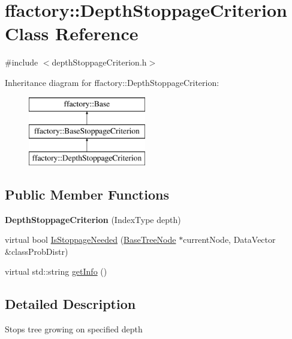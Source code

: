 \hypertarget{classffactory_1_1_depth_stoppage_criterion}{\section{ffactory\-:\-:Depth\-Stoppage\-Criterion Class Reference}
\label{classffactory_1_1_depth_stoppage_criterion}
}


{\ttfamily \#include $<$depth\-Stoppage\-Criterion.\-h$>$}

Inheritance diagram for ffactory\-:\-:Depth\-Stoppage\-Criterion\-:\begin{figure}[H]
\begin{center}
\leavevmode
\includegraphics[height=3.000000cm]{classffactory_1_1_depth_stoppage_criterion}
\end{center}
\end{figure}
\subsection*{Public Member Functions}
\begin{DoxyCompactItemize}
\item 
\hypertarget{classffactory_1_1_depth_stoppage_criterion_ad2287a470cebd743f7c7c4226f50885c}{{\bfseries Depth\-Stoppage\-Criterion} (Index\-Type depth)}\label{classffactory_1_1_depth_stoppage_criterion_ad2287a470cebd743f7c7c4226f50885c}

\item 
virtual bool \hyperlink{classffactory_1_1_depth_stoppage_criterion_a363d36a365b10f5d6ad05937c9944ea7}{Is\-Stoppage\-Needed} (\hyperlink{classffactory_1_1_base_tree_node}{Base\-Tree\-Node} $\ast$current\-Node, Data\-Vector \&class\-Prob\-Distr)
\item 
virtual std\-::string \hyperlink{classffactory_1_1_depth_stoppage_criterion_aeb81f88755a7dbae93a176ce8cee5624}{get\-Info} ()
\end{DoxyCompactItemize}


\subsection{Detailed Description}
Stops tree growing on specified depth 

